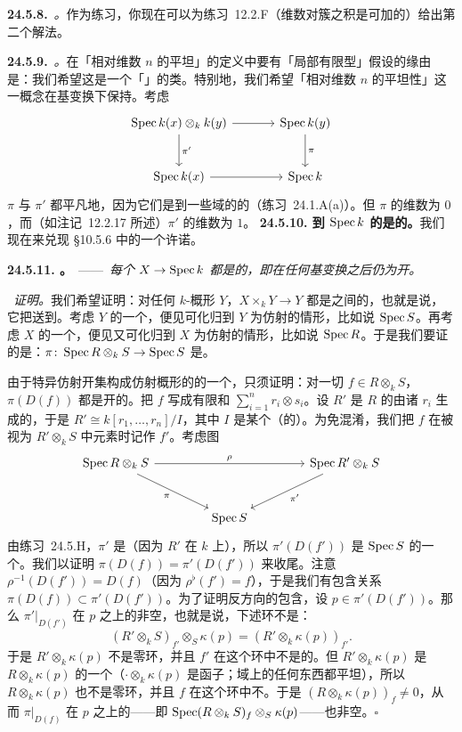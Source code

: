 \textbf{24.5.8.}\ \emph{\trhRemark。}\quad 作为练习，你现在可以为\mbox{练习~12.2.F}（维数对簇之积是可加的）给出第二个解法。

\textbf{24.5.9.}\ \emph{\trhRemark。}\quad 在「相对维数 $n$ 的平坦」的定义中要有「局部有限型」假设的缘由是：我们希望这是一个「\trReasonable」的\trMorphism{}类。特别地，我们希望「相对维数 $n$ 的平坦性」这一概念在基变换下保持。考虑\trCartesianDiagram
\[
\begin{tikzcd}[row sep=2.6em, column sep=3.4em]
\Spec k(x)\otimes_k k(y) \ar[r] \ar[d, "\pi'"] & \Spec k(y) \ar[d, "\pi"] \\
\Spec k(x) \ar[r] & \Spec k
\end{tikzcd}
\]
$\pi$ 与 $\pi'$ 都平凡地\trFlat，因为它们是到一些域的\trSpectrum{}的\trMorphism（\mbox{练习~24.1.A}(a)）。但 $\pi$ 的\trFiber{}维数为 $0$，而（如\mbox{注记~12.2.17} 所述）$\pi'$ 的\trFiber{}维数为 $1$。
\textbf{24.5.10. 到 $\operatorname{Spec} k$ 的\trMorphism{}是\trUniversallyOpen{}的。}\quad 我们现在来兑现 \S10.5.6 中的一个许诺。

\textbf{24.5.11. \trhTheorem。}\ ——\ \emph{每个\trMorphism{} $X\to\operatorname{Spec} k$ 都是\trUniversallyOpen{}的，即在\emph{任何}基变换之后仍为开。}

\hard\ \emph{证明。}\quad 我们希望证明：对任何 $k$-概形 $Y$，$X\times_k Y\to Y$ 都是\trTopologicalSpace{}之间的\trOpenMap，也就是说，它把\trOpenSet{}送到\trOpenSet。考虑 $Y$ 的一个\trAffine\trCover，便见可化归到 $Y$ 为仿射的情形，比如说 $\operatorname{Spec} S$。再考虑 $X$ 的一个\trAffine\trCover，便见又可化归到 $X$ 为仿射的情形，比如说 $\operatorname{Spec} R$。于是我们要证的是：$\pi\colon\operatorname{Spec} R\otimes_k S\to\operatorname{Spec} S$ 是\trOpenMap。

由于特异仿射开集构成仿射概形的\trZariskiTopology{}的一个\trBase，只须证明：对一切 $f\in R\otimes_k S$，$\pi(D(f))$ 都是开的。把 $f$ 写成有限和 $\sum_{i=1}^{n}r_i\otimes s_i$。设 $R'$ 是 $R$ 的由诸 $r_i$ 生成的\trSubring，于是 $R'\cong k[r_1,\dots,r_n]/I$，其中 $I$ 是某个（\trFinitelyGenerated{}的）\trIdeal。为免混淆，我们把 $f$ 在被视为 $R'\otimes_k S$ 中元素时记作 $f'$。考虑图
\[
\begin{tikzcd}[row sep=2.8em, column sep=4.2em]
\Spec R\otimes_k S \ar[rr, "\rho"] \ar[dr, "\pi"'] & & \Spec R'\otimes_k S \ar[dl, "\pi'"] \\
& \Spec S &
\end{tikzcd}
\]
由\mbox{练习~24.5.H}，$\pi'$ 是\trOpenMap（因为 $R'$ 在 $k$ 上\trFinitelyPresented），所以 $\pi'(D(f'))$ 是 $\operatorname{Spec} S$ 的一个\trOpenSubset。我们以证明 $\pi(D(f))=\pi'(D(f'))$ 来收尾。注意 $\rho^{-1}(D(f'))=D(f)$（因为 $\rho^{\flat}(f')=f$），于是我们有包含关系 $\pi(D(f))\subset\pi'(D(f'))$。为了证明反方向的包含，设 $p\in\pi'(D(f'))$。那么 $\pi'|_{D(f')}$ 在 $p$ 之上的\trFiber{}非空，也就是说，下述环不是\trZeroRing：
\[
(R'\otimes_k S)_{f'}\otimes_S\kappa(p)=(R'\otimes_k\kappa(p))_{f'}.
\]
于是 $R'\otimes_k\kappa(p)$ 不是零环，并且 $f'$ 在这个环中不是\trNilpotent{}的。但 $R'\otimes_k\kappa(p)$ 是 $R\otimes_k\kappa(p)$ 的一个\trSubring（$\cdot\otimes_k\kappa(p)$ 是\trExact{}函子；域上的任何东西都平坦），所以 $R\otimes_k\kappa(p)$ 也不是零环，并且 $f$ 在这个环中不\trNilpotent。于是 $(R\otimes_k\kappa(p))_f\neq 0$，从而 $\pi|_{D(f)}$ 在 $p$ 之上的\trFiber——即 $\operatorname{Spec}(R\otimes_k S)_f\otimes_S\kappa(p)$——也非空。\hfill$\square$

